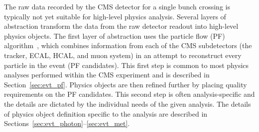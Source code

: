 The raw data recorded by the CMS detector for a single bunch crossing is typically not yet suitable for high-level physics analysis.
Several layers of abstraction transform the data from the raw detector readout into high-level physics objects.
The first layer of abstraction uses the particle flow (PF) algorithm~\cite{particle_flow}, which combines information from each of the CMS subdetectors (the tracker, ECAL, HCAL, and muon system) in an attempt to reconstruct every particle in the event (PF candidates).
This first step is common to most physics analyses performed within the CMS experiment and is described in Section~\ref{sec:evt_pf}.
Physics objects are then refined further by placing quality requirements on the PF candidates.
This second step is often analysis-specific and the details are dictated by the individual needs of the given analysis.
The details of physics object definition specific to the \ttH analysis are described in Sections~\ref{sec:evt_photon}--\ref{sec:evt_met}.

